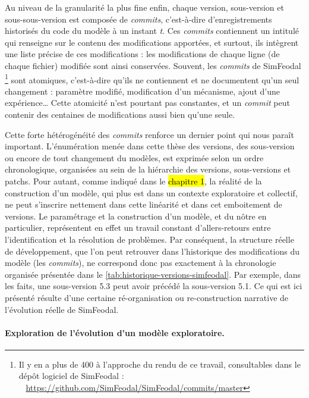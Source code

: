 Au niveau de la granularité la plus fine enfin, chaque version, sous-version et sous-sous-version est composée de \og \textit{commits}\fg{}, c'est-à-dire d'enregistrements historisés du code du modèle à un instant \textit{t}.
Ces \textit{commits} contiennent un intitulé qui renseigne sur le contenu des modifications apportées, et surtout, ils intègrent une liste précise de ces modifications : les modifications de chaque ligne (de chaque fichier) modifiée sont ainsi conservées.
Souvent, les \textit{commits} de SimFeodal \footnote{
	Il y en a plus de 400 à l'approche du rendu de ce travail, consultables dans le dépôt logiciel de SimFeodal :\\
	\faGithub~ \href{https://github.com/SimFeodal/SimFeodal/commits/master}{https://github.com/SimFeodal/SimFeodal/commits/master}
} sont \og atomiques\fg{}, c'est-à-dire qu'ils ne contiennent et ne documentent qu'un seul changement : paramètre modifié, modification d'un mécanisme, ajout d'une expérience\ldots
Cette atomicité n'est pourtant pas constantes, et un \textit{commit} peut contenir des centaines de modifications aussi bien qu'une seule.

Cette forte hétérogénéité des \textit{commits} renforce un dernier point qui nous paraît important.
L'énumération menée dans cette thèse des versions, des sous-version ou encore de tout changement du modèles, est exprimée selon un ordre chronologique, organisées au sein de la hiérarchie des versions, sous-versions et patchs.
Pour autant, comme indiqué dans le \hl{chapitre 1}, la réalité de la construction d'un modèle, qui plus est dans un contexte exploratoire et collectif, ne peut s'inscrire nettement dans cette linéarité et dans cet emboitement de versions.
Le paramétrage et la construction d'un modèle, et du nôtre en particulier, représentent en effet un travail constant d'allers-retours entre l'identification et la résolution de problèmes.
Par conséquent, la structure réelle de développement, que l'on peut retrouver dans l'historique des modifications du modèle (les \og \textit{commits}\fg{}), ne correspond donc pas exactement à la chronologie organisée présentée dans le \cref{tab:historique-versions-simfeodal}.
Par exemple, dans les faits, une sous-version 5.3 peut avoir précédé la sous-version 5.1.
Ce qui est ici présenté résulte d'une certaine ré-organisation ou re-construction narrative de l'évolution réelle de SimFeodal.

\paragraph{Exploration de l'évolution d'un modèle exploratoire.}

